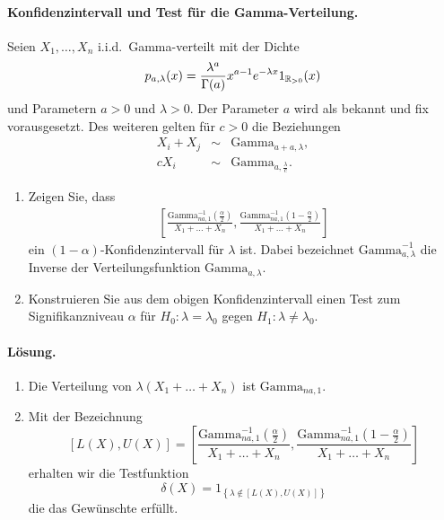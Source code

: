 \paragraph{Konfidenzintervall und Test für die Gamma-Verteilung. }
Seien $X_1, \ldots, X_n$ i.i.d.\ Gamma-verteilt mit der Dichte
\begin{equation*}
    p_{a,\lambda} (x) = \frac{\lambda^a}{ \Gamma(a)} x^{a-1} e^{-\lambda x} 1_{ \mathbb R_{>0}  } (x)
\end{equation*} 
und Parametern $a>0$ und $\lambda>0$. Der Parameter $a$ wird als bekannt und fix vorausgesetzt. 
Des weiteren gelten für $c>0$ die Beziehungen
\begin{eqnarray*}
    X_i + X_j &\sim& \textrm{Gamma}_{a+a, \lambda}, \\
    c X_i & \sim & \textrm{Gamma}_{a, \frac{\lambda}{c}}.
\end{eqnarray*}
\begin{enumerate}
    \item Zeigen Sie, dass \begin{eqnarray}
            \left[  \frac{ \textrm{Gamma}^{-1}_{na, 1} ( \frac{\alpha}{2})  }{X_1 + \ldots + X_n}, 
            \frac{ \textrm{Gamma}^{-1}_{na, 1} ( 1- \frac{\alpha}{2})  }{X_1+ \ldots + X_n}  \right]
        \end{eqnarray} ein $(1-\alpha)$-Konfidenzintervall für $\lambda$ ist.
        Dabei bezeichnet $\textrm{Gamma}^{-1}_{a,\lambda}$ die Inverse der Verteilungsfunktion 
        $\textrm{Gamma}_{a,\lambda}$.
    \item Konstruieren Sie aus dem obigen Konfidenzintervall einen Test zum Signifikanzniveau
        $\alpha$ für $H_0: \lambda=\lambda_0$ gegen $H_1: \lambda\neq \lambda_0$.
\end{enumerate} 

\paragraph*{Lösung.}
\begin{enumerate}
    \item Die Verteilung von $\lambda (X_1 + \ldots + X_n)$ ist $\textrm{Gamma}_{na, 1}$.
    \item Mit der Bezeichnung 
        \begin{equation}
            \left[ L(X), U(X) \right] = 
            \left[  \frac{ \textrm{Gamma}^{-1}_{na, 1} ( \frac{\alpha}{2})  }{X_1 + \ldots + X_n}, 
            \frac{ \textrm{Gamma}^{-1}_{na, 1} ( 1- \frac{\alpha}{2})  }{X_1+ \ldots + X_n}  \right]
        \end{equation}
        erhalten wir die Testfunktion
        \begin{equation}
            \delta(X) = 1_{ \left\{ \lambda \nin \left[ L(X), U(X) \right] \right\}   }
        \end{equation} die das Gewünschte erfüllt. 
\end{enumerate}








